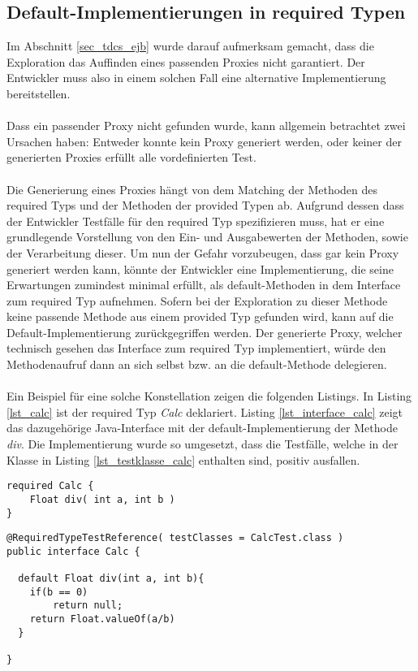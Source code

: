 \subsection{Default-Implementierungen in required Typen}
Im Abschnitt \ref{sec_tdcs_ejb} wurde darauf aufmerksam gemacht, dass die Exploration das Auffinden eines passenden Proxies nicht garantiert. Der Entwickler muss also in einem solchen Fall eine alternative Implementierung bereitstellen.
\\\\
Dass ein passender Proxy nicht gefunden wurde, kann allgemein betrachtet zwei Ursachen haben: Entweder konnte kein Proxy generiert werden, oder keiner der generierten Proxies erfüllt alle vordefinierten Test. 
\\\\
Die Generierung eines Proxies hängt von dem Matching der Methoden des required Typs und der Methoden der provided Typen ab. Aufgrund dessen dass der Entwickler Testfälle für den required Typ spezifizieren muss, hat er eine grundlegende Vorstellung von den Ein- und Ausgabewerten der Methoden, sowie der Verarbeitung dieser. Um nun der Gefahr vorzubeugen, dass gar kein Proxy generiert werden kann, könnte der Entwickler eine Implementierung, die seine Erwartungen zumindest minimal erfüllt, als default-Methoden in dem Interface zum required Typ aufnehmen. Sofern bei der Exploration zu dieser Methode keine passende Methode aus einem provided Typ gefunden wird, kann auf die Default-Implementierung zurückgegriffen werden. Der generierte Proxy, welcher technisch gesehen das Interface zum required Typ implementiert, würde den Methodenaufruf dann an sich selbst bzw. an die default-Methode delegieren.
\\\\
Ein Beispiel für eine solche Konstellation zeigen die folgenden Listings. In Listing \ref{lst_calc} ist der required Typ \emph{Calc} deklariert. Listing \ref{lst_interface_calc} zeigt das dazugehörige Java-Interface mit der default-Implementierung der Methode \emph{div}. Die Implementierung wurde so umgesetzt, dass die Testfälle, welche in der Klasse in Listing \ref{lst_testklasse_calc} enthalten sind, positiv ausfallen.
\begin{lstlisting}[caption={Required Typ \emph{Calc}},captionpos=b, style = dsl, label=lst_calc]
required Calc {
	Float div( int a, int b )	
}
\end{lstlisting}
\begin{lstlisting}[style = java, caption = Interface Calc, captionpos = b, label = lst_interface_calc]
@RequiredTypeTestReference( testClasses = CalcTest.class )
public interface Calc {

  default Float div(int a, int b){
  	if(b == 0)
  		return null;
  	return Float.valueOf(a/b)
  }

}
\end{lstlisting}
